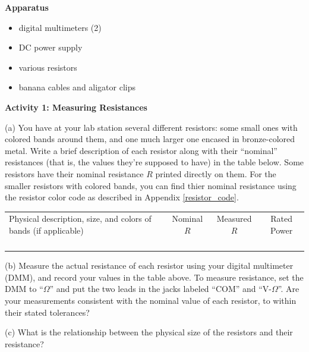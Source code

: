 \makelabheader %

\bigskip
\textbf{Apparatus}
\begin{itemize} [nosep]
\item digital multimeters (2)
\item DC power supply 
\item various resistors
\item banana cables and aligator clips
\end{itemize}

\textbf{Activity 1: Measuring Resistances}

(a) You have at your lab station several different resistors: some small ones with colored bands around them, and one much larger one encased in bronze-colored metal.  Write a brief description of each resistor along with their ``nominal'' resistances (that is, the values they're supposed to have) in the table below.  Some resistors have their nominal resistance $R$ printed directly on them.  For the smaller resistors with colored bands, you can find thier nominal resistance using the resistor color code as described in Appendix \ref{resistor_code}.  

\begin{center}
{\renewcommand{\arraystretch}{2.0}
\begin{tabular}{|C{3.8in}|c|c|c|} \hline 
Physical description, size, and colors of bands (if applicable) & Nominal $R$ & Measured $R$ & Rated Power \\ 
\hhline{|=|=|=|=|}
& & & \\ \hline 
& & & \\ \hline 
& & & \\ \hline 
& & & \\ \hline 
\end{tabular} }
\end{center}

(b) Measure the actual resistance of each resistor using your digital multimeter (DMM), and record your values in the table above.  To measure resistance, set the DMM to ``$\Omega$'' and put the two leads in the jacks labeled ``COM'' and ``V-$\Omega$''.  Are your measurements consistent with the nominal value of each resistor, to within their stated tolerances?
\answerspace{0.6in}

(c) What is the relationship between the physical size of the resistors and their resistance?
\answerspace{0.8in}

